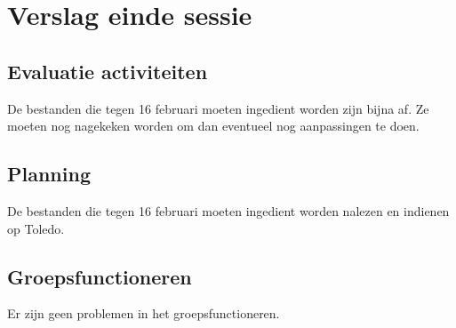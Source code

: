 \documentclass[12pt]{article}
\begin{document}
	
	\section{Verslag einde sessie}
	
	\subsection{Evaluatie activiteiten}
		De bestanden die tegen 16 februari moeten ingedient worden zijn bijna af. Ze moeten nog nagekeken worden om dan eventueel nog aanpassingen te doen.
	
	\subsection{Planning}
	
		De bestanden die tegen 16 februari moeten ingedient worden nalezen en indienen op Toledo.
	\subsection{Groepsfunctioneren}
		Er zijn geen problemen in het groepsfunctioneren.
	
	
	
	
	
\end{document}
